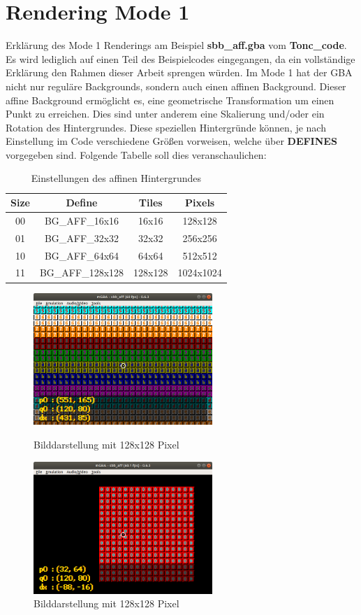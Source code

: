 \chapter{Rendering Mode 1}
Erklärung des Mode 1 Renderings am Beispiel \textbf{sbb\_aff.gba} vom \textbf{Tonc\_code}. Es wird lediglich auf einen Teil des Beispielcodes eingegangen, da ein vollständige Erklärung den Rahmen dieser Arbeit sprengen würden.
Im Mode 1 hat der GBA nicht nur reguläre Backgrounds, sondern auch einen affinen Background. 
Dieser affine Background ermöglicht es, eine geometrische Transformation um einen Punkt zu erreichen. Dies sind unter anderem eine Skalierung und/oder ein Rotation des Hintergrundes. Diese speziellen Hintergründe können, je nach Einstellung im Code verschiedene Größen vorweisen, welche über \textbf{DEFINES} vorgegeben sind. Folgende Tabelle soll dies veranschaulichen:
\begin{table}[ht]
\centering
\begin{tabular}{|c|c|c|c|}
\hline
\textbf{Size} & \textbf{Define} & \textbf{Tiles} & \textbf{Pixels} \\ \hline
00 & BG\_AFF\_16x16 & 16x16 & 128x128 \\ \hline
01 & BG\_AFF\_32x32 & 32x32 & 256x256 \\ \hline
10 & BG\_AFF\_64x64 & 64x64 & 512x512 \\ \hline
11 & BG\_AFF\_128x128 & 128x128 & 1024x1024 \\ \hline
\end{tabular}
\caption{Einstellungen des affinen Hintergrundes}
\label{size}
\end{table}
\begin{figure}
	\includegraphics[height=50mm]{img/pic128.png}
	\caption{Bilddarstellung mit 128x128 Pixel}
	\includegraphics[height=50mm]{img/pic16.png}
	\caption{Bilddarstellung mit 128x128 Pixel}
\end{figure}
